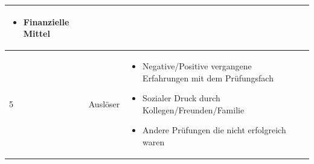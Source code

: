 \documentclass[12pt, a4paper]{article}
\begin{document}
\begin{table}[h!]
\begin{tabularx}{\textwidth}{|p{0.3cm}|p{3.5cm}|X|p{0.3cm}|}
\begin{itemize}[noitemsep, topsep=0pt]
			\item Finanzielle Mittel
		\end{itemize}
		&  \\
		\hline
		5 & Auslöser                               & 
		\begin{itemize}[noitemsep, topsep=0pt]
			\item Negative/Positive vergangene Erfahrungen mit dem Prüfungsfach
			\item Sozialer Druck durch Kollegen/Freunden/Familie
			\item Andere Prüfungen die nicht erfolgreich waren
		\end{itemize}
  &  \\
		\hline
	\end{tabularx}
	\newpage

	
\end{table}
\end{document}
